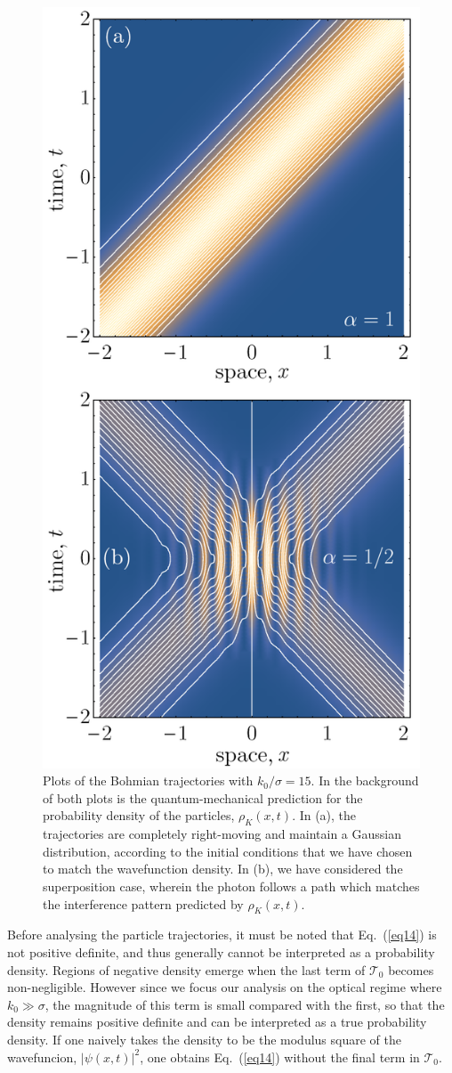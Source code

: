 \documentclass[12pt,prx,
,nofootinbib
,floatfix
,superscriptaddress
]{revtex4-2}
\begin{document}
\begin{figure}[htp]
    \centering
    \includegraphics[width=0.5\linewidth]{Fig2trajectoriessimplified.png}
    \caption{Plots of the Bohmian trajectories with $k_0/\sigma = 15$. In the background of both plots is the quantum-mechanical prediction for the probability density of the particles, $\rho_{K}(x,t)$. In (a), the trajectories are completely right-moving and maintain a Gaussian distribution, according to the initial conditions that we have chosen to match the wavefunction density. In (b), we have considered the superposition case, wherein the photon follows a path which matches the interference pattern predicted by $\rho_K(x,t)$. }
    \label{fig:trajectories1}
\end{figure}

Before analysing the particle trajectories, it must be noted that Eq.\ (\ref{eq14}) is not positive definite, and thus generally cannot be interpreted as a probability density. Regions of negative density emerge when the last term of $\mathcal{T}_0$ becomes non-negligible. However since we focus our analysis on the optical regime where $k_0 \gg \sigma$, the magnitude of this term is small compared with the first, so that the density remains positive definite and can be interpreted as a true probability density. If one naively takes the density to be the modulus square of the wavefuncion, $| \psi(x,t)|^2$, one obtains Eq.\ (\ref{eq14}) without the final term in $\mathcal{T}_0$. 
\end{document}
